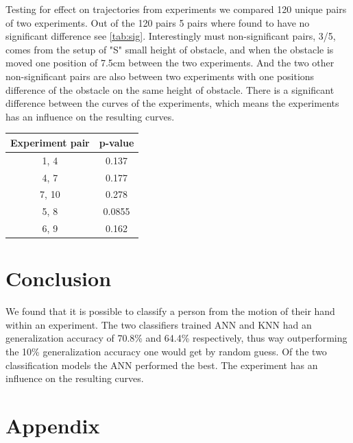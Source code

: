 \documentclass{article}
\begin{document}
\noindent Testing for effect on trajectories from experiments we compared 120 unique pairs of two experiments. Out of the 120 pairs 5 pairs where found to have no significant difference see \ref{tab:sig}. Interestingly must non-significant pairs, 3/5, comes from the setup of "S" small height of obstacle, and when the obstacle is moved one position of 7.5cm between the two experiments. And the two other non-significant pairs are also between two experiments with one positions difference of the obstacle on the same height of obstacle. There is a significant difference between the curves of the experiments, which means the experiments has an influence on the resulting curves.\bigskip

\begin{minipage}{\linewidth}
\centering
{}
\begin{tabular}{cc}\toprule[1.5pt]
\textbf{Experiment pair} & \textbf{p-value} \\\midrule[1.25pt]
1, 4         	& 0.137            \\\midrule
4, 7  		& 0.177            \\\midrule
7, 10           	& 0.278            \\\midrule
5, 8        	& 0.0855           \\\midrule
6, 9      	& 0.162           \\\bottomrule[1.25pt]
\end{tabular}
\label{tab:sig}
\end{minipage}

\section{Conclusion}
We found that it is possible to classify a person from the motion of their hand within an experiment. The two classifiers trained ANN and KNN had an generalization accuracy of 70.8\% and 64.4\% respectively, thus way outperforming the 10\% generalization accuracy one would get by random guess. Of the two classification models the ANN performed the best.
The experiment has an influence on the resulting curves. 

\section{Appendix}
\end{document}
